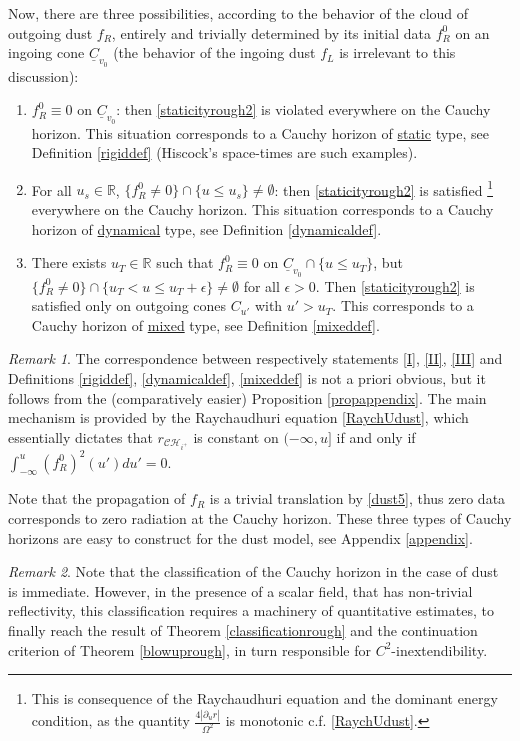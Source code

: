 \documentclass[10pt,a4paper]{article}
\theoremstyle{plain}
\theoremstyle{remark}
\newtheorem{rmk}{Remark}[section]
\theoremstyle{definition}
\newcommand{\RR}{\mathbb{R}}
\theoremstyle{plain}
\theoremstyle{remark}
\theoremstyle{definition}
\newcommand{\CH}{\mathcal{CH}_{i^+}}
\numberwithin{equation}{section}
\begin{document}
Now, there are three possibilities, according to the behavior of the cloud of outgoing dust $f_R$, entirely and trivially determined by its initial data $f_R^0$ on an ingoing cone $\underline{C}_{v_0}$ (the behavior of the ingoing dust $f_L$ is irrelevant to this discussion): \begin{enumerate}[I]
	\item \label{I} $f_R^0 \equiv 0$ on $\underline{C}_{v_0} $: then \eqref{staticityrough2} is violated everywhere on the Cauchy horizon. This situation corresponds to a Cauchy horizon of \underline{static} type, see Definition \ref{rigiddef} (Hiscock's space-times are such examples).
	\item \label{II}For all $u_s \in \RR$, $\{f_R^0 \neq 0\} \cap \{ u \leq u_s \} \neq \emptyset$: then \eqref{staticityrough2} is satisfied \footnote{This is consequence of the Raychaudhuri equation and the dominant energy condition, as the quantity $\frac{4|\partial_u r|}{\Omega^2}$ is monotonic c.f. \eqref{RaychUdust}. } everywhere on the Cauchy horizon. This situation corresponds to a Cauchy horizon of \underline{dynamical} type, see Definition \ref{dynamicaldef}.
	\item \label{III}There exists $u_T \in \RR $ such that $f_R^0 \equiv 0$ on $\underline{C}_{v_0} \cap \{ u\leq u_T\}$, but $\{f_R^0 \neq 0\} \cap \{u_T< u \leq u_{T}+\epsilon\} \neq \emptyset$ for all $\epsilon>0$. Then \eqref{staticityrough2} is satisfied only on outgoing cones $C_{u'}$ with $u'>u_T$. This corresponds to a Cauchy horizon of \underline{mixed} type, see Definition \ref{mixeddef}.
\end{enumerate} \begin{rmk}
The correspondence between respectively statements \ref{I}, \ref{II}, \ref{III} and Definitions \ref{rigiddef}, \ref{dynamicaldef}, \ref{mixeddef} is not a priori obvious, but it follows from the (comparatively easier) Proposition \ref{propappendix}. The main mechanism is provided by the Raychaudhuri equation \eqref{RaychUdust}, which essentially dictates that $r_{\CH}$ is constant on $(-\infty,u]$ if and only if $\int_{-\infty}^{u} (f^0_R)^2(u') du' =0$.
\end{rmk}
Note that the propagation of $f_R$ is a trivial translation by \eqref{dust5}, thus zero data corresponds to zero radiation at the Cauchy horizon. These three types of Cauchy horizons are easy to construct for the dust model, see Appendix \ref{appendix}.
\color{black}
\begin{rmk}
	Note that the classification of the Cauchy horizon in the case of dust is immediate. However, in the presence of a scalar field, that has non-trivial reflectivity, this classification requires a machinery of quantitative estimates, to finally reach the result of Theorem \ref{classificationrough} and the continuation criterion of Theorem \ref{blowuprough}, in turn responsible for $C^2$-inextendibility.
\end{rmk}
\end{document}
